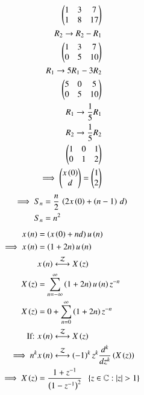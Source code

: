 \documentclass[journal,12pt,twocolumn]{IEEEtran}
\theoremstyle{remark}
\begin{document}
\begin{align}\vspace{3cm}
 \begin{pmatrix}
1&3&7\\
1&8&17
 \end{pmatrix}
 \\
 R_2\rightarrow R_2-R_1\notag\\
 \begin{pmatrix}
    1&3&7\\
    0&5&10
 \end{pmatrix}
 \\
 R_1\rightarrow 5R_1-3R_2\notag\\
 \begin{pmatrix}
    5&0&5\\
    0&5&10
 \end{pmatrix}
 \\
 R_1\rightarrow\frac{1}{5}R_1\notag\\ R_2\rightarrow\frac{1}{5}R_2\notag\\
 \begin{pmatrix}
    1&0&1\\
    0&1&2
 \end{pmatrix}\\
 \implies
 \begin{pmatrix}
    x\brak{0}\\
    d
 \end{pmatrix}
 =
 \begin{pmatrix}
    1\\2
 \end{pmatrix}
\end{align}
\begin{align}
\implies S_n&= \frac{n}{2}\,\left(2x\left(0\right)+\left(n-1\right)\,d\right)\label{eq10.5.3.9.4}\\
S_n&=n^2\label{eq10.5.3.9.5}
\end{align}
\begin{align}
    x\brak{n}&=\brak{x\brak{0}+nd}u\brak{n}\\
    \implies x\brak{n}&= \brak{1+2n}u\brak{n}\\
    &x\brak{n}\system{Z}X\brak{z}\\
    X\brak{z}&= \sum_{n=-\infty}^{\infty}\brak{1+2n}u\brak{n} z^{-n}\\
    X\brak{z}&=0+\sum_{n=0}^{\infty}\brak{1+2n} z^{-n}\\
    \text{If: }\notag &x\brak{n}\system{Z}X\brak{z}\\
    \implies n^k&x\brak{n}\system{Z}\brak{-1}^{k}z^k\frac{d^k}{dz^k}\brak{X\brak{z}}\notag\\
    \implies X\brak{z}&=\frac{1+z^{-1}}{\brak{1-z^{-1}}^2} \;\;\cbrak{z\in\mathbb{C}: |z|>1}
\end{align}
\end{document}
